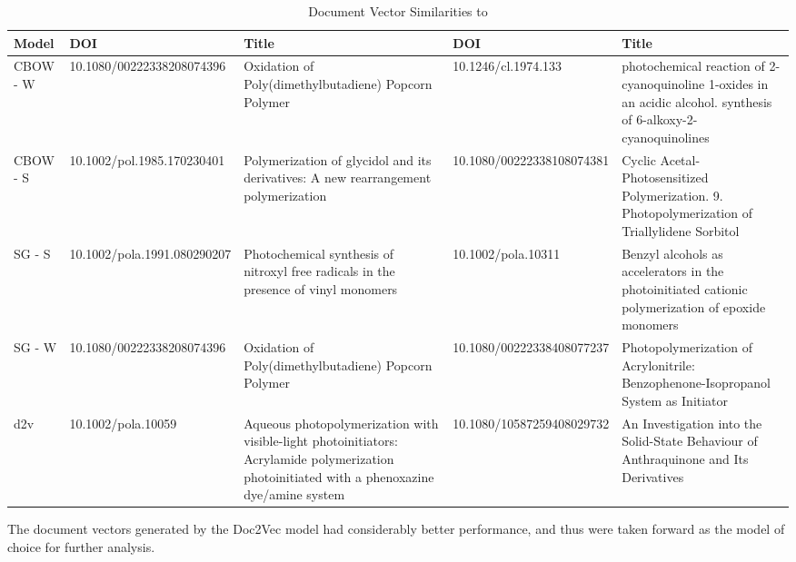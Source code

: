 \begin{table}[H]
\centering
\caption{Document Vector Similarities to \cite {docassay}}
\label{tab:DOCSIMS}
\begin{tabular}{|l|l|p{4cm}|l|p{4cm}|}
\hline
Model           & DOI            & Title            & DOI              & Title              \\ \hline
CBOW - W               & \tiny{10.1080/00222338208074396}          & \footnotesize{Oxidation of Poly(dimethylbutadiene) Popcorn Polymer} &  \tiny{10.1246/cl.1974.133}                &                   \footnotesize{photochemical reaction of 2-cyanoquinoline 1-oxides in an acidic alcohol. synthesis of 6-alkoxy-2-cyanoquinolines} \\ \hline
CBOW - S               & \tiny{10.1002/pol.1985.170230401}           &  \footnotesize{Polymerization of glycidol and its derivatives: A new rearrangement polymerization}
                & \tiny{10.1080/00222338108074381}                & \footnotesize{Cyclic Acetal-Photosensitized Polymerization. 9. Photopolymerization of Triallylidene Sorbitol}
                   \\ \hline
SG - S                 & \tiny{10.1002/pola.1991.080290207}               &   \footnotesize{Photochemical synthesis of nitroxyl free radicals in the presence of vinyl monomers}
               &  \tiny{10.1002/pola.10311}                &  \footnotesize{Benzyl alcohols as accelerators in the photoinitiated cationic polymerization of epoxide monomers}
                  \\ \hline
SG - W                 & \tiny{10.1080/00222338208074396}            &    \footnotesize{Oxidation of Poly(dimethylbutadiene) Popcorn Polymer}
              & \tiny{10.1080/00222338408077237}                &  \footnotesize{Photopolymerization of Acrylonitrile: Benzophenone-Isopropanol System as Initiator}
                 \\ \hline
d2v                    &  \tiny{10.1002/pola.10059}              &  \footnotesize{Aqueous photopolymerization with visible-light photoinitiators: Acrylamide polymerization photoinitiated with a phenoxazine dye/amine system}
                & \tiny{10.1080/10587259408029732}                 & \footnotesize{ An Investigation into the Solid-State Behaviour of Anthraquinone and Its Derivatives}
                 \\ \hline
\end{tabular}
\end{table}
The document vectors generated by the Doc2Vec model had considerably better performance, and thus were taken forward as the model of choice for further analysis.  
